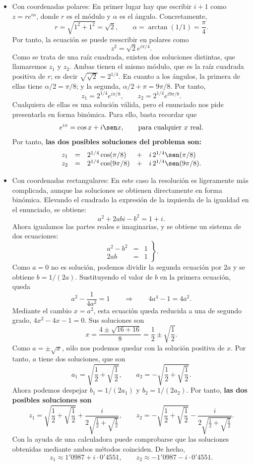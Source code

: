 \documentclass[12pt,a4paper]{report}
\begin{document}
\begin{itemize}
 \item Con coordenadas polares: En primer lugar hay que escribir $i+1$ como $z=re^{i\alpha}$, donde $r$ es el m\'odulo y $\alpha$ es el \'angulo. Concretamente,
\[
 r = \sqrt{1^2+1^2}= \sqrt{2},\qquad \alpha = \arctan(1/1) = \frac{\pi}{4}.
\]
Por tanto, la ecuaci\'on se puede reescribir en polares como
\[
 z^2 = \sqrt{2}e^{i\pi/4}.
\]
Como se trata de una ra\'iz cuadrada, existen dos soluciones distintas, que llamaremos $z_1$ y $z_2$. Ambas tienen el mismo m\'odulo, que es la ra\'iz cuadrada positiva de $r$; es decir $\sqrt{\sqrt{2}}=2^{1/4}$. En cuanto a los \'angulos, la primera de ellas tiene $\alpha/2=\pi/8$; y la segunda, $\alpha/2+\pi=9\pi/8$. Por tanto,
\[
 z_1 = 2^{1/4}e^{i\pi/8},\qquad z_2=2^{1/4}e^{i9\pi/8}.
\]
Cualquiera de ellas es una soluci\'on v\'alida, pero el enunciado nos pide presentarla en forma bin\'omica. Para ello, basta recordar que
\[
 e^{ix} = \cos x+i\sen x, \qquad\text{para cualquier $x$ real}.
\]
Por tanto, {\bf las dos posibles soluciones del problema son:}
\[
\begin{array}{cclcl}
 z_1 & = & 2^{1/4}\cos(\pi/8) & + & i\,2^{1/4}\sen(\pi/8) \\
 z_2 & = & 2^{1/4}\cos(9\pi/8) & + & i\,2^{1/4}\sen(9\pi/8).
\end{array}
\]

\item Con coordenadas rectangulares: En este caso la resoluci\'on es ligeramente m\'as complicada, aunque las soluciones se obtienen directamente en forma bin\'omica. Elevando el cuadrado la expresi\'on de la izquierda de la igualdad en el enunciado, se obtiene:
\[
 a^2 +2abi - b^2 = 1 + i.
\]
Ahora igualamos las partes reales e imaginarias, y se obtiene un sistema de dos ecuaciones:
\[
 \left.\begin{array}{rcc}
  a^2 - b^2 & = & 1 \\
  2ab & = & 1
 \end{array}\right\}.
\]
Como $a=0$ no es soluci\'on, podemos dividir la segunda ecuaci\'on por $2a$ y se obtiene $b=1/(2a)$. Sustituyendo el valor de $b$ en la primera ecuaci\'on, queda
\[
 a^2 - \frac{1}{4a^2} = 1\qquad \Rightarrow \qquad 4a^4-1=4a^2.
\]
Mediante el cambio $x=a^2$, esta ecuaci\'on queda reducida a una de segundo grado, $4x^2-4x-1 = 0$. Sus soluciones son
\[
 x = \frac{4\pm\sqrt{16+16}}{8}=\frac12\pm\sqrt{\frac12}.
\]
Como $a=\pm\sqrt{x}$, s\'olo nos podemos quedar con la soluci\'on positiva de $x$. Por tanto, $a$ tiene dos soluciones, que son
\[
 a_1 = \sqrt{\frac12+\sqrt{\frac12}},\qquad a_2 = -\sqrt{\frac12+\sqrt{\frac12}}.
\]
Ahora podemos despejar $b_1=1/(2a_1)$ y $b_2=1/(2a_2)$. Por tanto, {\bf las dos posibles soluciones son}
\[
 z_1 = \sqrt{\frac12+\sqrt{\frac12}}+\frac{i}{2\sqrt{\frac12+\sqrt{\frac12}}}, \qquad z_2 = -\sqrt{\frac12+\sqrt{\frac12}}-\frac{i}{2\sqrt{\frac12+\sqrt{\frac12}}}.
\]
Con la ayuda de una calculadora puede comprobarse que las soluciones obtenidas mediante ambos m\'etodos coinciden. De hecho,
\[
 z_1 \approx 1'0987 + i\cdot0'4551, \qquad z_2 \approx -1'0987 - i\cdot0'4551.
\]


\end{itemize}
\end{document}
